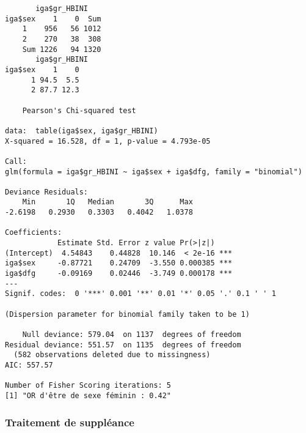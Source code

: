 \documentclass[11pt,a4paper]{article}\usepackage[]{graphicx}\usepackage[]{color}
\makeatletter
\newenvironment{kframe}{%
 \def\at@end@of@kframe{}%
 \ifinner\ifhmode%
  \def\at@end@of@kframe{\end{minipage}}%
  \begin{minipage}{\columnwidth}%
 \fi\fi%
 \def\FrameCommand##1{\hskip\@totalleftmargin \hskip-\fboxsep
 \colorbox{shadecolor}{##1}\hskip-\fboxsep
     \hskip-\linewidth \hskip-\@totalleftmargin \hskip\columnwidth}%
 \MakeFramed {\advance\hsize-\width
   \@totalleftmargin\z@ \linewidth\hsize
   \@setminipage}}%
 {\par\unskip\endMakeFramed%
 \at@end@of@kframe}
\newenvironment{knitrout}{}{} %
\makeatother
\begin{document}
\begin{knitrout}
\color{fgcolor}\begin{kframe}
\begin{verbatim}
       iga$gr_HBINI
iga$sex    1    0  Sum
    1    956   56 1012
    2    270   38  308
    Sum 1226   94 1320
       iga$gr_HBINI
iga$sex    1    0
      1 94.5  5.5
      2 87.7 12.3

	Pearson's Chi-squared test

data:  table(iga$sex, iga$gr_HBINI)
X-squared = 16.528, df = 1, p-value = 4.793e-05

Call:
glm(formula = iga$gr_HBINI ~ iga$sex + iga$dfg, family = "binomial")

Deviance Residuals: 
    Min       1Q   Median       3Q      Max  
-2.6198   0.2930   0.3303   0.4042   1.0378  

Coefficients:
            Estimate Std. Error z value Pr(>|z|)    
(Intercept)  4.54843    0.44828  10.146  < 2e-16 ***
iga$sex     -0.87721    0.24709  -3.550 0.000385 ***
iga$dfg     -0.09169    0.02446  -3.749 0.000178 ***
---
Signif. codes:  0 '***' 0.001 '**' 0.01 '*' 0.05 '.' 0.1 ' ' 1

(Dispersion parameter for binomial family taken to be 1)

    Null deviance: 579.04  on 1137  degrees of freedom
Residual deviance: 551.57  on 1135  degrees of freedom
  (582 observations deleted due to missingness)
AIC: 557.57

Number of Fisher Scoring iterations: 5
[1] "OR d'être de sexe féminin : 0.42"
\end{verbatim}
\end{kframe}
\end{knitrout}


    \subsubsection{Traitement de suppléance}
\end{document}
